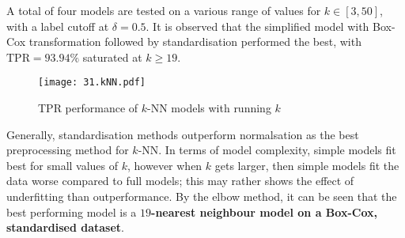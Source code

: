 A total of four models are tested on a various range of values for \( k \in [3, 50]\), with a label cutoff at \( \delta = 0.5 \). It is observed that the simplified model with Box-Cox transformation followed by standardisation performed the best, with \( \text{TPR} = 93.94\% \) saturated at \( k \ge 19 \). 

\begin{figure}[H]
    \texttt{[image: 31.kNN.pdf]}
    \caption{\centering TPR performance of \( k \)-NN models with running \(k\)}
\end{figure}
    
Generally, standardisation methods outperform normalsation as the best preprocessing method for \( k \)-NN. In terms of model complexity, simple models fit best for small values of \( k \), however when \( k \) gets larger, then simple models fit the data worse compared to full models; this may rather shows the effect of underfitting than outperformance. By the elbow method, it can be seen that the best performing model is a \textbf{\( 19 \)-nearest neighbour model on a Box-Cox, standardised dataset}.